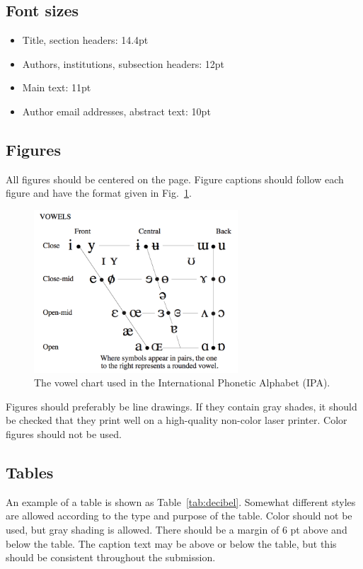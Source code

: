 \documentclass{tls}
\begin{document}
\subsection{Font sizes}

\begin{itemize}
  \item Title, section headers: 14.4pt
  \item Authors, institutions, subsection headers: 12pt
  \item Main text: 11pt
  \item Author email addresses, abstract text: 10pt
\end{itemize}

\subsection{Figures}

All figures should be centered on the page. Figure captions should follow each
figure and have the format given in Fig.~\ref{fig:vowels}.

\begin{figure}[ht]
  \begin{center}
    \includegraphics[width=3in]{Example-IPA.png}
  \end{center}
  \caption{The vowel chart used in the International Phonetic Alphabet (IPA).}
  \label{fig:vowels}
\end{figure}

Figures should preferably be line drawings. If they contain gray shades, it should be checked that they print well on a high-quality non-color laser printer. Color figures should not be used.

\subsection{Tables}

An example of a table is shown as Table~\ref{tab:decibel}. Somewhat different styles are allowed according to the type and purpose of the table. Color should not be used, but gray shading is allowed. There should be a margin of 6 pt above and below the table. The caption text may be above or below the table, but this should be consistent throughout the submission.
\end{document}
